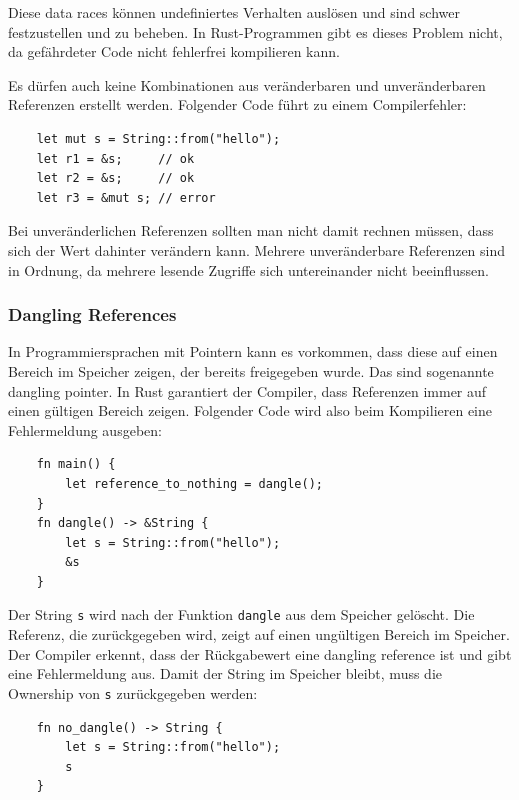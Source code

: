 Diese \glqq data races\grqq{} können undefiniertes Verhalten auslösen und sind schwer festzustellen und zu beheben. In Rust-Programmen gibt es dieses Problem nicht, da gefährdeter Code nicht fehlerfrei kompilieren kann.

Es dürfen auch keine Kombinationen aus veränderbaren und unveränderbaren Referenzen erstellt werden. Folgender Code führt zu einem Compilerfehler:

\begin{lstlisting}
    let mut s = String::from("hello");
    let r1 = &s;     // ok
    let r2 = &s;     // ok
    let r3 = &mut s; // error
\end{lstlisting}

Bei unveränderlichen Referenzen sollten man nicht damit rechnen müssen, dass sich der Wert dahinter verändern kann. Mehrere unveränderbare Referenzen sind in Ordnung, da mehrere lesende Zugriffe sich untereinander nicht beeinflussen.

\subsubsection{\glqq Dangling References\grqq{}}

In Programmiersprachen mit Pointern kann es vorkommen, dass diese auf einen Bereich im Speicher zeigen, der bereits freigegeben wurde. Das sind sogenannte \glqq dangling pointer\grqq{}. In Rust garantiert der Compiler, dass Referenzen immer auf einen gültigen Bereich zeigen. Folgender Code wird also beim Kompilieren eine Fehlermeldung ausgeben:

\begin{lstlisting}
    fn main() {
        let reference_to_nothing = dangle();
    }
    fn dangle() -> &String {
        let s = String::from("hello");
        &s
    }
\end{lstlisting}

Der String \verb"s" wird nach der Funktion \verb"dangle" aus dem Speicher gelöscht. Die Referenz, die zurückgegeben wird, zeigt auf einen ungültigen Bereich im Speicher. Der Compiler erkennt, dass der Rückgabewert eine \glqq dangling reference\grqq{} ist und gibt eine Fehlermeldung aus. Damit der String im Speicher bleibt, muss die Ownership von \verb"s" zurückgegeben werden:

\begin{lstlisting}
    fn no_dangle() -> String {
        let s = String::from("hello");
        s
    }
\end{lstlisting}

